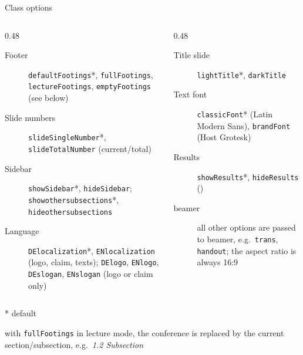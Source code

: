 \begin{frame}{Class options}
	\beamerdefaultoverlayspecification{}%
	\scriptsize
	\begin{columns}[T]
		\begin{column}{0.48\textwidth}
			\begin{description}
				\item[Footer] \texttt{defaultFootings}*, \texttt{fullFootings}, \texttt{lectureFootings}, \texttt{emptyFootings} (see below)
				\item[Slide numbers] \texttt{slideSingleNumber}*, \texttt{slideTotalNumber} (current/total)
				\item[Sidebar] \texttt{showSidebar}*, \texttt{hideSidebar}; \texttt{showothersubsections}*, \texttt{hideothersubsections}
				\item[Language] \texttt{DElocalization}*, \texttt{ENlocalization} (logo, claim, texts); \texttt{DElogo}, \texttt{ENlogo}, \texttt{DEslogan}, \texttt{ENslogan} (logo or claim only)
			\end{description}
		\end{column}
		\begin{column}{0.48\textwidth}
			\begin{description}
				\item[Title slide] \texttt{lightTitle}*, \texttt{darkTitle}
				\item[Text font] \texttt{classicFont}* (Latin Modern Sans), \texttt{brandFont} (Host Grotesk)
				\item[Results] \texttt{showResults}*, \texttt{hideResults} ()
				\item[beamer] all other options are passed to beamer, e.g.\ \texttt{trans}, \texttt{handout}; the aspect ratio is always 16:9
			\end{description}
		\end{column}
	\end{columns}
	\medskip
	* default
	\vfill
	\hfill
	\par\medskip
	\hfill
	\par
	\smallskip
	{\tiny with \texttt{fullFootings} in lecture mode, the conference is replaced by the current section/subsection, e.g.\ \emph{1.2 Subsection}}
\end{frame}
%
